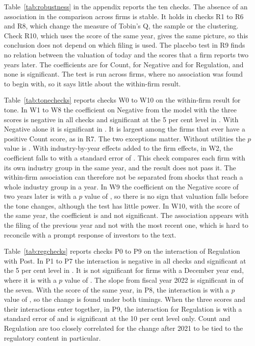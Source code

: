 \documentclass[12pt,a4paper]{article}
\begin{document}
Table~\ref{tab:robustness} in the appendix reports the ten checks. The absence of an association in the comparison across firms is stable. It holds in checks R1 to R6 and R8, which change the measure of Tobin's Q, the sample or the clustering. Check R10, which uses the score of the same year, gives the same picture, so this conclusion does not depend on which filing is used. The placebo test in R9 finds no relation between the valuation of today and the scores that a firm reports two years later. The coefficients are \coefRNineCount{} for Count, \coefRNineNeg{} for Negative and \coefRNineReg{} for Regulation, and none is significant. The test is run across firms, where no association was found to begin with, so it says little about the within-firm result.

Table~\ref{tab:tonechecks} reports checks W0 to W10 on the within-firm result for tone. In W1 to W8 the coefficient on Negative from the model with the three scores is negative in all \nNegWJ{} checks and significant at the 5 per cent level in \nSigWJ{}. With Negative alone it is significant in \nSigWA{}. It is largest among the firms that ever have a positive Count score, as in R7. The two exceptions matter. Without utilities the $p$ value is \pvalWThreeJ{}. With industry-by-year effects added to the firm effects, in W2, the coefficient falls to \coefWTwoJ{} with a standard error of \seWTwoJ{}. This check compares each firm with its own industry group in the same year, and the result does not pass it. The within-firm association can therefore not be separated from shocks that reach a whole industry group in a year. In W9 the coefficient on the Negative score of two years later is \coefWNineLeadJ{} with a $p$ value of \pvalWNineLeadJ{}, so there is no sign that valuation falls before the tone changes, although the test has little power. In W10, with the score of the same year, the coefficient is \coefWTenJ{} and not significant. The association appears with the filing of the previous year and not with the most recent one, which is hard to reconcile with a prompt response of investors to the text.

Table~\ref{tab:regchecks} reports checks P0 to P9 on the interaction of Regulation with Post. In P1 to P7 the interaction is negative in all \nNegPIx{} checks and significant at the 5 per cent level in \nSigPIx{}. It is not significant for firms with a December year end, where it is \coefPFiveIx{} with a $p$ value of \pvalPFiveIx{}. The slope from fiscal year 2022 is significant in \nSigPSlope{} of the seven. With the score of the same year, in P8, the interaction is \coefPEightIx{} with a $p$ value of \pvalPEightIx{}, so the change is found under both timings. When the three scores and their interactions enter together, in P9, the interaction for Regulation is \coefPNineIx{} with a standard error of \sePNineIx{} and is significant at the 10 per cent level only. Count and Regulation are too closely correlated for the change after 2021 to be tied to the regulatory content in particular.
\end{document}
